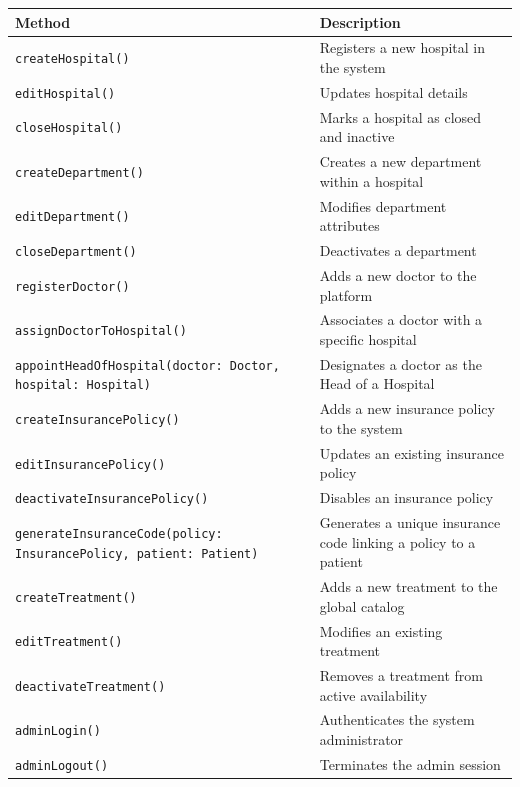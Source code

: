 \documentclass[12pt, a4paper]{article}
\begin{document}
\begin{center}
\small
\renewcommand{\arraystretch}{1.35}
\begin{tabularx}{\textwidth}{|M|Y|}
\hline
{}
\textbf{Method} & \textbf{Description} \\ \hline
\texttt{createHospital()} & Registers a new hospital in the system \\ \hline
\texttt{editHospital()} & Updates hospital details \\ \hline
\texttt{closeHospital()} & Marks a hospital as closed and inactive \\ \hline
\texttt{createDepartment()} & Creates a new department within a hospital \\ \hline
\texttt{editDepartment()} & Modifies department attributes \\ \hline
\texttt{closeDepartment()} & Deactivates a department \\ \hline
\texttt{registerDoctor()} & Adds a new doctor to the platform \\ \hline
\texttt{assignDoctorToHospital()} & Associates a doctor with a specific hospital \\ \hline
\texttt{appointHeadOfHospital(doctor: Doctor, hospital: Hospital)} & Designates a doctor as the Head of a Hospital \\ \hline
\texttt{createInsurancePolicy()} & Adds a new insurance policy to the system \\ \hline
\texttt{editInsurancePolicy()} & Updates an existing insurance policy \\ \hline
\texttt{deactivateInsurancePolicy()} & Disables an insurance policy \\ \hline
\texttt{generateInsuranceCode(policy: InsurancePolicy, patient: Patient)} & Generates a unique insurance code linking a policy to a patient \\ \hline
\texttt{createTreatment()} & Adds a new treatment to the global catalog \\ \hline
\texttt{editTreatment()} & Modifies an existing treatment \\ \hline
\texttt{deactivateTreatment()} & Removes a treatment from active availability \\ \hline
\texttt{adminLogin()} & Authenticates the system administrator \\ \hline
\texttt{adminLogout()} & Terminates the admin session \\ \hline
\end{tabularx}
\end{center}
\end{document}
